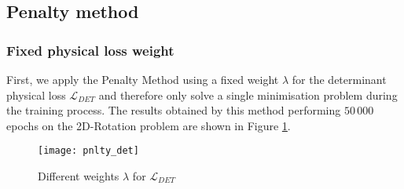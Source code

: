 \subsection{Penalty method}
\subsubsection{Fixed physical loss weight}
First, we apply the Penalty Method using a fixed weight $\lambda$ for the determinant physical loss $\mathcal{L}_{DET}$ and therefore only solve a single minimisation problem during the training process. The results obtained by this method performing $50\,000$ epochs on the 2D-Rotation problem are shown in Figure \ref{fig:pnlty_det}.

\begin{figure}[ht]
	\texttt{[image: pnlty\_det]}
	\caption{Different weights $\lambda$ for $\mathcal{L}_{DET}$}
	\label{fig:pnlty_det}
\end{figure}


